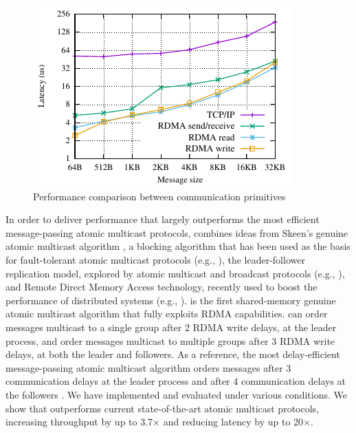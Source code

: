 \begin{figure}[htp!]
    \centering
    \includegraphics[width=0.99\columnwidth]{figures/benchmark/graphs/figure-protocol-bench.pdf}
  \caption{Performance comparison between communication primitives}
  \label{fig:perfcomp}
\end{figure}

In order to deliver performance that largely outperforms the most efficient message-passing atomic multicast protocols, \libname combines ideas from Skeen's genuine atomic multicast algorithm \cite{BJ87b}, a blocking algorithm that has been used as the basis for fault-tolerant atomic multicast protocols (e.g., \cite{Coelho2017,gotsman2019white}), the leader-follower replication model, explored by atomic multicast and broadcast protocols (e.g., \cite{gotsman2019white,Junqueira2011,Mu,delta4}), and Remote Direct Memory Access technology, recently used to boost the performance of distributed systems (e.g., \cite{Aguilera2019,kalia2014using, kalia2016design, mitchell2013using}).
%
\libname is the first shared-memory genuine atomic multicast algorithm that fully exploits RDMA capabilities.
\libname can order messages multicast to a single group after 2 RDMA write delays, at the leader process, and order messages multicast to multiple groups after 3 RDMA write delays, at both the leader and followers. As a reference, the most delay-efficient message-passing atomic multicast algorithm orders messages after 3 communication delays at the leader process and after 4 communication delays at the followers \cite{gotsman2019white}.
We have implemented and evaluated \libname under various conditions. 
We show that \libname outperforms current state-of-the-art atomic multicast protocols, increasing throughput by up to 3.7$\times$ and reducing latency by up to 20$\times$.

